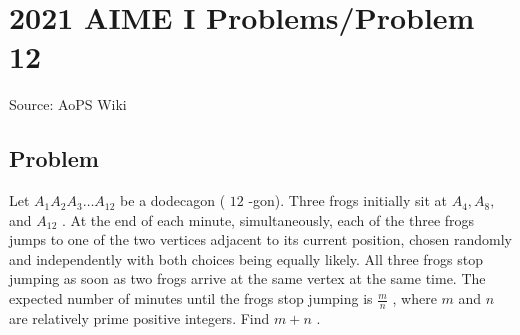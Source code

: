 \documentclass[12pt]{article}
\begin{document}
\section*{{2021 AIME I Problems/Problem 12}}
Source: AoPS Wiki

\subsection*{Problem}
Let $A_1A_2A_3\ldots A_{12}$ be a dodecagon ( $12$ -gon). Three frogs initially sit at $A_4,A_8,$ and $A_{12}$ . At the end of each minute, simultaneously, each of the three frogs jumps to one of the two vertices adjacent to its current position, chosen randomly and independently with both choices being equally likely. All three frogs stop jumping as soon as two frogs arrive at the same vertex at the same time. The expected number of minutes until the frogs stop jumping is $\frac mn$ , where $m$ and $n$ are relatively prime positive integers. Find $m+n$ .
\end{document}

